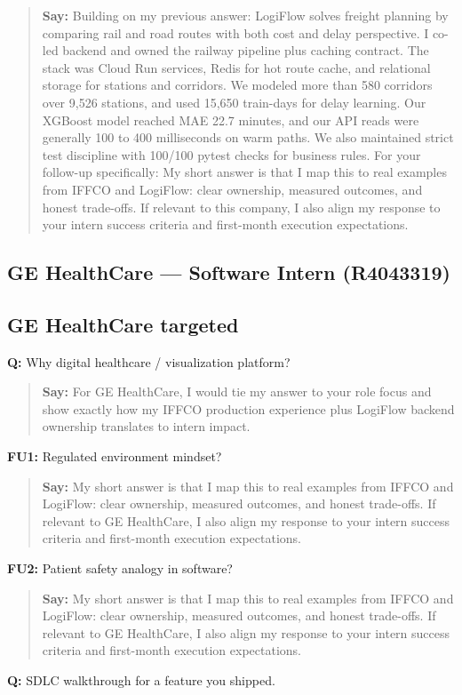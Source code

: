 \documentclass[9pt,a4paper]{article}
\begin{document}
\begin{quote}\small\textbf{Say:} Building on my previous answer: LogiFlow solves freight planning by comparing rail and road routes with both cost and delay perspective. I co-led backend and owned the railway pipeline plus caching contract. The stack was Cloud Run services, Redis for hot route cache, and relational storage for stations and corridors. We modeled more than 580 corridors over 9,526 stations, and used 15,650 train-days for delay learning. Our XGBoost model reached MAE 22.7 minutes, and our API reads were generally 100 to 400 milliseconds on warm paths. We also maintained strict test discipline with 100/100 pytest checks for business rules. For your follow-up specifically: My short answer is that I map this to real examples from IFFCO and LogiFlow: clear ownership, measured outcomes, and honest trade-offs. If relevant to this company, I also align my response to your intern success criteria and first-month execution expectations.\end{quote}
\vspace{2mm}
\newpage
\subsection{GE HealthCare --- Software Intern (R4043319)}
\subsection{GE HealthCare targeted}
\textbf{Q:} Why digital healthcare / visualization platform?

\begin{quote}\small\textbf{Say:} For GE HealthCare, I would tie my answer to your role focus and show exactly how my IFFCO production experience plus LogiFlow backend ownership translates to intern impact.\end{quote}
\vspace{2mm}
\textbf{FU1:} Regulated environment mindset?

\begin{quote}\small\textbf{Say:} My short answer is that I map this to real examples from IFFCO and LogiFlow: clear ownership, measured outcomes, and honest trade-offs. If relevant to GE HealthCare, I also align my response to your intern success criteria and first-month execution expectations.\end{quote}
\vspace{2mm}
\textbf{FU2:} Patient safety analogy in software?

\begin{quote}\small\textbf{Say:} My short answer is that I map this to real examples from IFFCO and LogiFlow: clear ownership, measured outcomes, and honest trade-offs. If relevant to GE HealthCare, I also align my response to your intern success criteria and first-month execution expectations.\end{quote}
\vspace{2mm}
\textbf{Q:} SDLC walkthrough for a feature you shipped.
\end{document}
